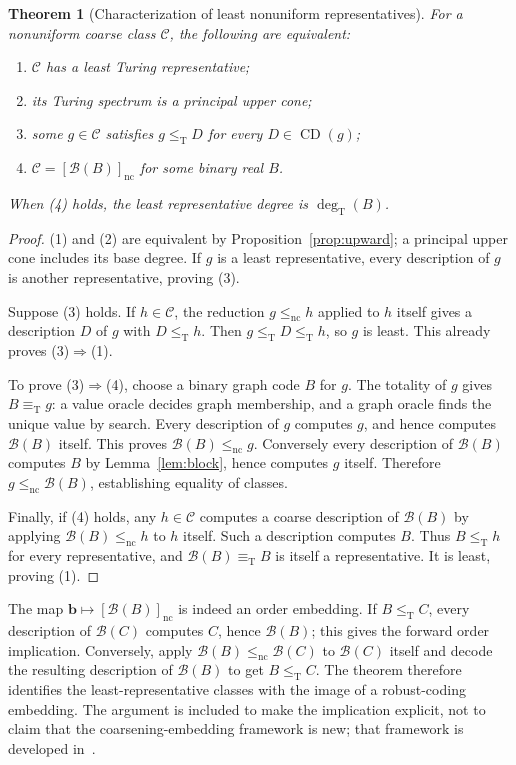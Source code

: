 \documentclass[11pt,a4paper]{article}
\newcommand{\leT}{\leq_{\mathrm T}}
\newcommand{\eqT}{\equiv_{\mathrm T}}
\newcommand{\degT}{\operatorname{deg}_{\mathrm T}}
\newcommand{\CD}{\operatorname{CD}}
\newcommand{\nc}{\mathrm{nc}}
\newcommand{\Block}{\mathcal B}
\newtheorem{theorem}{Theorem}[section]
\theoremstyle{definition}
\theoremstyle{remark}
\begin{document}
\begin{theorem}[Characterization of least nonuniform representatives]
\label{thm:characterization}
For a nonuniform coarse class $\mathcal C$, the following are equivalent:
\begin{enumerate}[label=\textup{(\arabic*)}]
\item $\mathcal C$ has a least Turing representative;
\item its Turing spectrum is a principal upper cone;
\item some $g\in\mathcal C$ satisfies
$g\leT D$ for every $D\in\CD(g)$;
\item $\mathcal C=[\Block(B)]_{\nc}$ for some binary real $B$.
\end{enumerate}
When (4) holds, the least representative degree is $\degT(B)$.
\end{theorem}
\begin{proof}
(1) and (2) are equivalent by Proposition~\ref{prop:upward}; a principal
upper cone includes its base degree. If $g$ is a least representative,
every description of $g$ is another representative, proving (3).

Suppose (3) holds. If $h\in\mathcal C$, the reduction $g\le_{\nc}h$
applied to $h$ itself gives a description $D$ of $g$ with $D\leT h$.
Then $g\leT D\leT h$, so $g$ is least. This already proves (3)$\Rightarrow$(1).

To prove (3)$\Rightarrow$(4), choose a binary graph code $B$ for $g$.
The totality of $g$ gives $B\eqT g$: a value oracle decides graph
membership, and a graph oracle finds the unique value by search. Every
description of $g$ computes $g$, and hence computes $\Block(B)$ itself.
This proves $\Block(B)\le_{\nc}g$. Conversely every description of
$\Block(B)$ computes $B$ by Lemma~\ref{lem:block}, hence computes $g$
itself. Therefore $g\le_{\nc}\Block(B)$, establishing equality of classes.

Finally, if (4) holds, any $h\in\mathcal C$ computes a coarse description
of $\Block(B)$ by applying $\Block(B)\le_{\nc}h$ to $h$ itself.
Such a description computes $B$. Thus $B\leT h$ for every representative,
and $\Block(B)\eqT B$ is itself a representative. It is least, proving (1).
\end{proof}

The map $\mathbf b\mapsto[\Block(B)]_{\nc}$ is indeed an order embedding.
If $B\leT C$, every description of $\Block(C)$ computes $C$, hence
$\Block(B)$; this gives the forward order implication. Conversely, apply
$\Block(B)\le_{\nc}\Block(C)$ to $\Block(C)$ itself and decode the
resulting description of $\Block(B)$ to get $B\leT C$.
The theorem therefore identifies the least-representative classes with
the image of a robust-coding embedding. The argument is included to make
the implication explicit, not to claim that the coarsening-embedding
framework is new; that framework is developed in~\cite{HJKS}.
\end{document}
